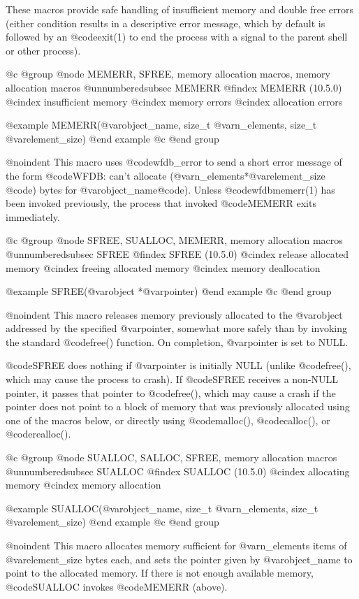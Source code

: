 {{{{{{{{{These macros provide safe handling of insufficient memory and double free
errors (either condition results in a descriptive error message, which by
default is followed by an @code{exit(1)} to end the process with a signal
to the parent shell or other process).


@c @group
@node     MEMERR, SFREE, memory allocation macros, memory allocation macros
@unnumberedsubsec MEMERR
@findex MEMERR (10.5.0)
@cindex insufficient memory
@cindex memory errors
@cindex allocation errors

@example
MEMERR(@var{object_name}, size_t @var{n_elements}, size_t @var{element_size})
@end example
@c @end group

@noindent
This macro uses @code{wfdb_error} to send a short error message of the form
@code{WFDB: can't allocate (}@var{n_elements}*@var{element_size} @code{) bytes
for }@var{object_name}@code{)}.  Unless @code{wfdbmemerr(1)} has been invoked
previously, the process that invoked @code{MEMERR} exits immediately.

@c @group
@node     SFREE, SUALLOC, MEMERR, memory allocation macros
@unnumberedsubsec SFREE
@findex SFREE (10.5.0)
@cindex release allocated memory
@cindex freeing allocated memory
@cindex memory deallocation

@example
SFREE(@var{object} *@var{pointer})
@end example
@c @end group

@noindent
This macro releases memory previously allocated to the @var{object} addressed
by the specified @var{pointer}, somewhat more safely than by invoking the
standard @code{free()} function.  On completion, @var{pointer} is set to NULL.

@code{SFREE} does nothing if @var{pointer} is initially NULL (unlike
@code{free()}, which may cause the process to crash).  If @code{SFREE} receives
a non-NULL pointer, it passes that pointer to @code{free()}, which may cause a
crash if the pointer does not point to a block of memory that was previously
allocated using one of the macros below, or directly using @code{malloc()},
@code{calloc()}, or @code{realloc()}.

@c @group
@node     SUALLOC, SALLOC, SFREE, memory allocation macros
@unnumberedsubsec SUALLOC
@findex SUALLOC (10.5.0)
@cindex allocating memory
@cindex memory allocation

@example
SUALLOC(@var{object_name}, size_t @var{n_elements}, size_t @var{element_size})
@end example
@c @end group

@noindent
This macro allocates memory sufficient for @var{n_elements} items of
@var{element_size} bytes each, and sets the pointer given by @var{object_name}
to point to the allocated memory.  If there is not enough available memory,
@code{SUALLOC} invokes @code{MEMERR} (above).

}}}}}}}}}
